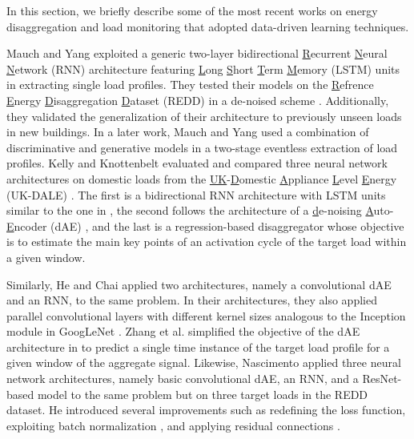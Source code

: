 \documentclass[twocolumn,letter,10pt]{IEEEtran} %
\begin{document}
In this section, we briefly describe some of the most recent works on energy disaggregation and load monitoring that adopted data-driven learning techniques.

Mauch and Yang \cite{Mauch_2015} exploited a generic two-layer bidirectional \underline{R}ecurrent \underline{N}eural \underline{N}etwork (RNN) architecture featuring \underline{L}ong \underline{S}hort \underline{T}erm \underline{M}emory (LSTM) \cite{Hochreiter_1997_LSTM} units in extracting single load profiles. They tested their models on the \underline{R}efrence \underline{E}nergy \underline{D}isaggregation \underline{D}ataset (REDD) \cite{Kolter_2011_REDD} in a de-noised scheme \cite{Makonin_2015_NILMPerformanceEvaluation}. Additionally, they  validated the generalization of their architecture to previously unseen loads in new buildings. In a later work, Mauch and Yang \cite{Mauch_2016} used a combination of discriminative and generative models in a two-stage eventless extraction of load profiles. Kelly and Knottenbelt \cite{Kelly_2015} evaluated and compared three neural network architectures on domestic loads from the \underline{UK}-\underline{D}omestic \underline{A}ppliance \underline{L}evel \underline{E}nergy (UK-DALE) \cite{Kelly_2015_UKDALE}. The first is a bidirectional RNN architecture with LSTM units similar to the one in \cite{Mauch_2015}, the second follows the architecture of a \underline{d}e-noising \underline{A}uto-\underline{E}ncoder (dAE) \cite{Vincent_2010}, and the last is a regression-based disaggregator whose objective is to estimate the main key points of an activation cycle of the target load within a given window.

Similarly, He and Chai \cite{He_2016_AnEmpiricalStudy} applied two architectures, namely a convolutional dAE and an RNN, to the same problem. In their architectures, they also applied parallel convolutional layers with different kernel sizes analogous to the Inception module in GoogLeNet \cite{Szegedy_2015}. Zhang et al. \cite{Zhang_2016_SequenceToPointLearning} simplified the objective of the dAE architecture in \cite{Kelly_2015} to predict a single time instance of the target load profile for a given window of the aggregate signal.
Likewise, Nascimento \cite{Nascimento_2016} applied three neural network architectures, namely basic convolutional dAE, an RNN, and a ResNet-based model \cite{He_2015_ResNet} to the same problem but on three target loads in the REDD dataset. He introduced several improvements such as redefining the loss function, exploiting batch normalization \cite{Ioffe_2015_BatchNormalization}, and applying residual connections \cite{He_2015_ResNet}.
\end{document}

